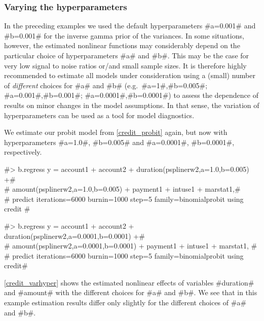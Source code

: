 \clearpage

\subsubsection{Varying the hyperparameters}

In the preceding examples we used the default hyperparameters
#a=0.001# and #b=0.001# for the inverse gamma prior of the
variances. In some situations, however, the estimated nonlinear
functions may considerably depend on the particular choice of
hyperparameters #a# and #b#. This may be the case for very low
signal to noise ratios or/and small sample sizes. It is therefore
highly recommended to estimate all models under consideration
using a (small) number of {\em different} choices for #a# and #b#
(e.g.~#a=1#,#b=0.005#; #a=0.001#,#b=0.001#; #a=0.0001#,#b=0.0001#)
to assess the dependence of results on minor changes in the model
assumptions. In that sense, the variation of hyperparameters can
be used as a tool for model diagnostics.

We estimate our probit model from \autoref{credit_probit} again,
but now with hyperparameters #a=1.0#, #b=0.005# and #a=0.0001#,
#b=0.0001#, respectively.

 #> b.regress  y = account1 + account2 + duration(psplinerw2,a=1.0,b=0.005) +# \\
 #  amount(psplinerw2,a=1.0,b=0.005) + payment1 + intuse1 + marstat1,# \\
 #  predict iterations=6000 burnin=1000 step=5 family=binomialprobit using credit #

 #> b.regress  y = account1 + account2 + duration(psplinerw2,a=0.0001,b=0.0001) +# \\
 #  amount(psplinerw2,a=0.0001,b=0.0001) + payment1 + intuse1 + marstat1, #\\
 #  predict iterations=6000 burnin=1000 step=5 family=binomialprobit using credit#

\autoref{credit_varhyper} shows the estimated nonlinear effects of
variables #duration# and #amount# with the different choices for
#a# and #b#. We see that in this example estimation results differ
only slightly for the different choices of #a# and #b#.


